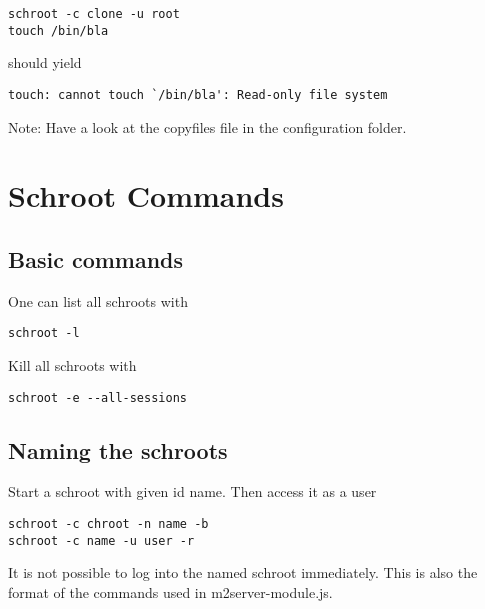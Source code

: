 \documentclass[a4paper]{book}
\begin{document}
\begin{verbatim}
schroot -c clone -u root
touch /bin/bla
\end{verbatim}

should yield

\begin{verbatim}
touch: cannot touch `/bin/bla': Read-only file system
\end{verbatim}

Note: Have a look at the copyfiles file in the configuration folder.

\section{Schroot Commands}
\subsection{Basic commands}
One can list all schroots with

\begin{verbatim}
schroot -l
\end{verbatim}

Kill all schroots with

\begin{verbatim}
schroot -e --all-sessions
\end{verbatim}

\subsection{Naming the schroots}
Start a schroot with given id name. Then access it as a user

\begin{verbatim}
schroot -c chroot -n name -b
schroot -c name -u user -r
\end{verbatim}

It is not possible to log into the named schroot immediately.
This is also the format of the commands used in m2server-module.js.
\end{document}
